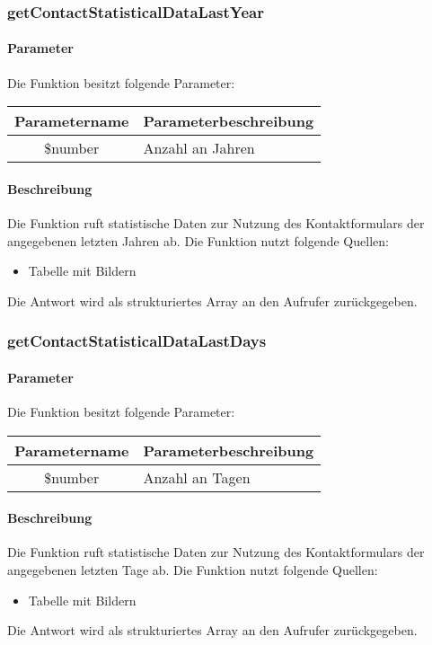 \subsubsection{getContactStatisticalDataLastYear}
\paragraph{Parameter} Die Funktion besitzt folgende Parameter:
\begin{table}[H]
	\begin{tabular}{|c|p{11cm}|}
		\hline
		\textbf{Parametername} & \textbf{Parameterbeschreibung} \\ \hline
		\$number & Anzahl an Jahren \\ \hline
	\end{tabular}
\end{table}
\paragraph{Beschreibung} Die Funktion ruft statistische Daten zur Nutzung des Kontaktformulars der angegebenen letzten Jahren ab. Die Funktion nutzt folgende Quellen:
\begin{itemize}
	\item Tabelle mit Bildern
\end{itemize}
Die Antwort wird als strukturiertes Array an den Aufrufer zurückgegeben.
\subsubsection{getContactStatisticalDataLastDays}
\paragraph{Parameter} Die Funktion besitzt folgende Parameter:
\begin{table}[H]
	\begin{tabular}{|c|p{11cm}|}
		\hline
		\textbf{Parametername} & \textbf{Parameterbeschreibung} \\ \hline
		\$number & Anzahl an Tagen \\ \hline
	\end{tabular}
\end{table}
\paragraph{Beschreibung} Die Funktion ruft statistische Daten zur Nutzung des Kontaktformulars der angegebenen letzten Tage ab. Die Funktion nutzt folgende Quellen:
\begin{itemize}
	\item Tabelle mit Bildern
\end{itemize}
Die Antwort wird als strukturiertes Array an den Aufrufer zurückgegeben.